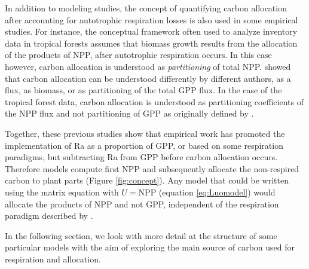 \documentclass[bg, manuscript]{copernicus}
\begin{document}
In addition to modeling studies, the concept of quantifying carbon allocation after accounting for autotrophic respiration losses is also used in some empirical studies. For instance, the conceptual framework often used to analyze inventory data in tropical forests \citep[e.g.][]{Malhi2011, Malhi2015} assumes that biomass growth results from the allocation of the products of NPP, after autotrophic respiration occurs. In this case however, carbon allocation is understood as \emph{partitioning} of total NPP. \citet{Litton2007} showed that carbon allocation can be understood differently by different authors, as a flux, as biomass, or as partitioning of the total GPP flux. In the case of the tropical forest data, carbon allocation is understood as partitioning coefficients of the NPP flux and not partitioning of GPP as originally defined by \citet{Litton2007}.  

Together, these previous studies show that empirical work has promoted the implementation of Ra as a proportion of GPP, or based on some respiration paradigms, but subtracting Ra from GPP before carbon allocation occurs. Therefore models compute first NPP and subsequently allocate the non-respired carbon to plant parts (Figure \ref{fig:concept}). Any model that could be written using the matrix equation with $U = \mathrm{NPP}$ (equation \ref{eq:Luomodel}) would allocate the products of NPP and not GPP, independent of the respiration paradigm described by \citet{Amthor2000}. 

In the following section, we look with more detail at the structure of some particular models with the aim of exploring the main source of carbon used for respiration and allocation.
\end{document}
